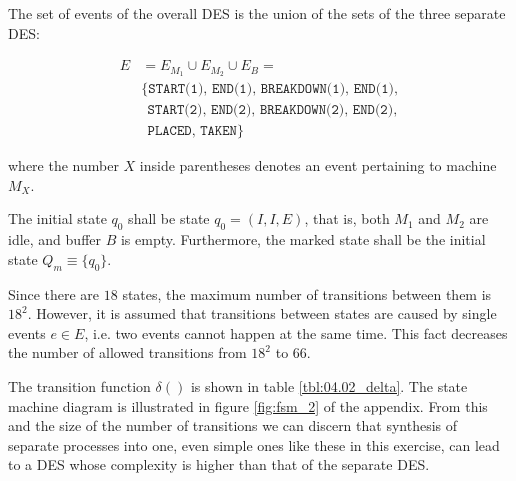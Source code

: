 The set of events of the overall DES is the union of the sets of the three
separate DES:

\begin{align*}
  E &= E_{M_1} \cup E_{M_2} \cup E_{B} = \\
    & \{\texttt{START(1), END(1), BREAKDOWN(1), END(1)}, \\
    &\ \ \texttt{START(2), END(2), BREAKDOWN(2), END(2)}, \\
    &\ \ \texttt{PLACED, TAKEN}\}
\end{align*}

where the number $X$ inside parentheses denotes an event pertaining to machine
$M_X$.

The initial state $q_0$ shall be state $q_0 = (I,I,E)$, that is, both $M_1$ and
$M_2$ are idle, and buffer $B$ is empty. Furthermore, the marked state shall be
the initial state $Q_m \equiv \{q_0\}$.

Since there are $18$ states, the maximum number of transitions between them is
$18^2$. However, it is assumed that transitions between states are caused by
single events $e \in E$, i.e. two events cannot happen
at the same time. This fact decreases the number of allowed transitions from
$18^2$ to $66$.

The transition function $\delta()$ is shown in table \ref{tbl:04.02_delta}.
The state machine diagram is illustrated in figure \ref{fig:fsm_2} of the
appendix. From this and the size of the number of transitions we can discern
that synthesis of separate processes into one, even simple ones like these in
this exercise, can lead to a DES whose complexity is higher than that of the
separate DES.

